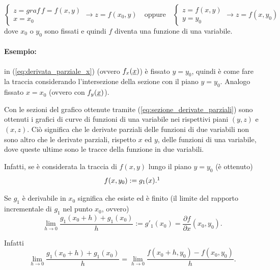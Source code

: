 \begin{equation}\label{eq:sezione_derivate_parziali}
	\begin{cases}
		z=graf\, f=f(x,y)\\
		x=x_0
	\end{cases}\rightarrow z=f(x_0,y)
	\quad\text{oppure}\quad
	\begin{cases}
		z=f(x,y)\\
		y=y_0
	\end{cases}\rightarrow z=f(x,y_0)
\end{equation}
dove $x_0$ o $y_0$ sono fissati e quindi $f$ diventa una funzione di una variabile.

\paragraph{Esempio:} in (\ref{eq:derivata_parziale_x}) (ovvero $f_x(\uline x)$) è fissato $y=y_0$, quindi è come fare la traccia considerando l'intersezione della sezione con il piano $y=y_0$. Analogo fissato $x=x_0$ (ovvero con $f_y(\uline x)$).

Con le sezioni del grafico ottenute tramite (\ref{eq:sezione_derivate_parziali}) sono ottenuti i grafici di curve di funzioni di una variabile nei rispettivi piani $(y,z)$ e $(x,z)$. Ciò significa che le derivate parziali delle funzioni di due variabili non sono altro che le derivate parziali, rispetto $x$ ed $y$, delle funzioni di una variabile, dove queste ultime sono le tracce della funzione in due variabili.

Infatti, se è considerata la traccia di $f(x,y)$ lungo il piano $y=y_0$ (è ottenuto)
\begin{equation*}
	f(x,y_0):=g_1(x). \footnotemark
\end{equation*}

Se $g_1$ è derivabile in $x_0$ significa che esiste ed è finito (il limite del rapporto incrementale di $g_1$ nel punto $x_0$, ovvero)
\begin{equation*}
	\lim\limits_{h\rightarrow 0}\frac{g_1(x_0+h)+g_1(x_0)}{h}:=g'_1(x_0)=\frac{\partial f}{\partial x}(x_0,y_0).
\end{equation*}

Infatti
\begin{equation*}
	\lim\limits_{h\rightarrow 0}\frac{g_1(x_0+h)+g_1(x_0)}{h}=\lim\limits_{h\rightarrow 0}\frac{f(x_0+h,y_0)-f(x_0,y_0)}{h}.
\end{equation*}

